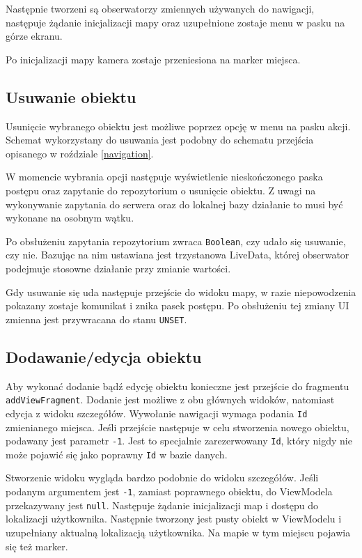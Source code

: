 \documentclass[polish,polish,a4paper,12pt]{article}
\begin{document}
	Następnie tworzeni są obserwatorzy zmiennych używanych do nawigacji, następuje żądanie inicjalizacji mapy oraz uzupełnione zostaje menu w pasku na górze ekranu.

	Po inicjalizacji mapy kamera zostaje przeniesiona na marker miejsca.

	\subsection{Usuwanie obiektu}

	Usunięcie wybranego obiektu jest możliwe poprzez opcję w menu na pasku akcji. Schemat wykorzystany do usuwania jest podobny do schematu przejścia opisanego w roździale \ref{navigation}.

	W momencie wybrania opcji następuje wyświetlenie nieskończonego paska postępu oraz zapytanie do repozytorium o usunięcie obiektu. Z uwagi na wykonywanie zapytania do serwera oraz do lokalnej bazy działanie to musi być wykonane na osobnym wątku.

	Po obsłużeniu zapytania repozytorium zwraca \texttt{Boolean}, czy udało się usuwanie, czy nie. Bazując na nim ustawiana jest trzystanowa LiveData, której obserwator podejmuje stosowne działanie przy zmianie wartości.

	Gdy usuwanie się uda następuje przejście do widoku mapy, w razie niepowodzenia pokazany zostaje komunikat i znika pasek postępu. Po obsłużeniu tej zmiany UI zmienna jest przywracana do stanu \texttt{UNSET}.

	\subsection{Dodawanie/edycja obiektu}

	Aby wykonać dodanie bądź edycję obiektu konieczne jest przejście do fragmentu \texttt{addViewFragment}. Dodanie jest możliwe z obu głównych widoków, natomiast edycja z widoku szczegółów. Wywołanie nawigacji wymaga podania \texttt{Id} zmienianego miejsca. Jeśli przejście następuje w celu stworzenia nowego obiektu, podawany jest parametr \texttt{-1}. Jest to specjalnie zarezerwowany \texttt{Id}, który nigdy nie może pojawić się jako poprawny \texttt{Id} w bazie danych.

	Stworzenie widoku wygląda bardzo podobnie do widoku szczegółów. Jeśli podanym argumentem jest \texttt{-1}, zamiast poprawnego obiektu, do ViewModela przekazywany jest \texttt{null}. Następuje żądanie inicjalizacji map i dostępu do lokalizacji użytkownika. Następnie tworzony jest pusty obiekt w ViewModelu i uzupełniany aktualną lokalizacją użytkownika. Na mapie w tym miejscu pojawia się też marker.
\end{document}
